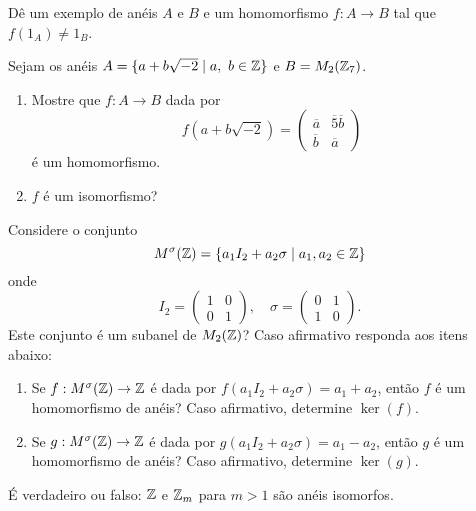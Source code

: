 \documentclass[12pt]{exam}
\begin{document}
\vspace{.3cm}

\questao{} Dê um exemplo de anéis $A$ e $B$ e um homomorfismo $f : A \to B$ tal que $f(1_A) \ne 1_B$.

\vspace{.3cm}

\questao{} Sejam os anéis $A = \{ a + b\sqrt{-2} \mid a,\ b \in \mathbb{Z}\}$ e $B = M_2(\mathbb{Z}_7)$.
\begin{enumerate}[label=({\alph*})]
    \item Mostre que $f : A \to B$ dada por
    \[
        f(a + b\sqrt{-2}) =
        \begin{pmatrix}
            \overline{a} & \overline{5}\overline{b}\\
            \overline{b} & \overline{a}
        \end{pmatrix}
    \]
    é um homomorfismo.

    \item $f$ é um isomorfismo?
\end{enumerate}

\vspace{.3cm}

\questao{} Considere o conjunto
\[
    M^\sigma(\mathbb{Z}) = \{a_1I_2 + a_2\sigma \mid a_1, a_2 \in \mathbb{Z}\}
\]
onde
\[
    I_2 = \begin{pmatrix} 1 & 0\\ 0 & 1\end{pmatrix}, \quad \sigma = \begin{pmatrix} 0 & 1\\ 1 & 0\end{pmatrix}.
\]
Este conjunto é um subanel de $M_2(\mathbb{Z})$? Caso afirmativo responda aos itens abaixo:
\begin{enumerate}[label=({\alph*})]
    \item Se $f : M^\sigma(\mathbb{Z}) \to \mathbb{Z}$ é dada por $f(a_1I_2 + a_2\sigma) = a_1 + a_2$, então $f$ é um homomorfismo de anéis? Caso afirmativo, determine $\ker(f)$.

    \item Se $g : M^\sigma(\mathbb{Z}) \to \mathbb{Z}$ é dada por $g(a_1I_2 + a_2\sigma) = a_1 - a_2$, então $g$ é um homomorfismo de anéis? Caso afirmativo, determine $\ker(g)$.
\end{enumerate}

\vspace{.3cm}

\questao{} É verdadeiro ou falso: $\mathbb{Z}$ e $\mathbb{Z}_{m}$ para $m > 1$ são anéis
isomorfos.
\end{document}
